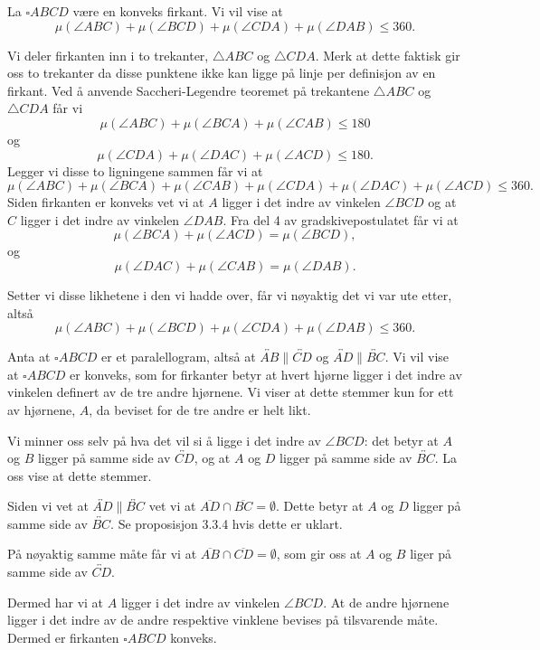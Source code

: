 \begin{oppgave}[4.6.1]
    La $\square ABCD$ være en konveks firkant. Vi vil vise at
    $$\mu(\angle ABC) + \mu(\angle BCD) + \mu(\angle CDA) + \mu(\angle DAB) \leq 360.$$

    \begin{figure}[H]
        \centering
        
    \end{figure}

    Vi deler firkanten inn i to trekanter, $\triangle ABC$ og $\triangle CDA$. 
    Merk at dette faktisk gir oss to trekanter da disse punktene ikke kan ligge på linje per definisjon av en firkant. 
    Ved å anvende Saccheri-Legendre teoremet på trekantene $\triangle ABC$ og $\triangle CDA$ får vi 
    $$\mu(\angle ABC)+\mu(\angle BCA)+\mu(\angle CAB)\leq 180$$
    og
    $$\mu(\angle CDA)+\mu(\angle DAC)+\mu(\angle ACD)\leq 180.$$
    Legger vi disse to ligningene sammen får vi at 
    $$\mu(\angle ABC)+\mu(\angle BCA)+\mu(\angle CAB)+\mu(\angle CDA)+\mu(\angle DAC)+\mu(\angle ACD)\leq 360.$$
    Siden firkanten er konveks vet vi at $A$ ligger i det indre av vinkelen $\angle BCD$ og at $C$ ligger i det indre av vinkelen $\angle DAB$. 
    Fra del 4 av gradskivepostulatet får vi at 
    $$\mu(\angle BCA)+\mu(\angle ACD)=\mu(\angle BCD),$$
    og 
    $$\mu(\angle DAC)+\mu(\angle CAB)=\mu(\angle DAB).$$

    Setter vi disse likhetene i den vi hadde over, får vi nøyaktig det vi var ute etter, altså 
    $$\mu(\angle ABC) + \mu(\angle BCD) + \mu(\angle CDA) + \mu(\angle DAB) \leq 360.$$
\end{oppgave}

\begin{oppgave}[4.6.2]
    Anta at $\square ABCD$ er et paralellogram, altså at $\overleftrightarrow{AB}\parallel \overleftrightarrow{CD}$ og $\overleftrightarrow{AD}\parallel \overleftrightarrow{BC}$.
    Vi vil vise at $\square ABCD$ er konveks, som for firkanter betyr at hvert hjørne ligger i det indre av vinkelen definert av de tre andre hjørnene. 
    Vi viser at dette stemmer kun for ett av hjørnene, $A$, da beviset for de tre andre er helt likt. 

    Vi minner oss selv på hva det vil si å ligge i det indre av $\angle BCD$: 
    det betyr at $A$ og $B$ ligger på samme side av $\overleftrightarrow{CD}$, og at $A$ og $D$ ligger på samme side av $\overleftrightarrow{BC}$. 
    La oss vise at dette stemmer. 

    Siden vi vet at $\overleftrightarrow{AD}\parallel \overleftrightarrow{BC}$ vet vi at $\overline{AD}\cap \overline{BC}=\emptyset$. 
    Dette betyr at $A$ og $D$ ligger på samme side av $\overleftrightarrow{BC}$. Se proposisjon 3.3.4 hvis dette er uklart. 

    På nøyaktig samme måte får vi at $\overline{AB}\cap \overline{CD}=\emptyset$, som gir oss at $A$ og $B$ liger på samme side av $\overleftrightarrow{CD}$.
    
    Dermed har vi at $A$ ligger i det indre av vinkelen $\angle BCD$. 
    At de andre hjørnene ligger i det indre av de andre respektive vinklene bevises på tilsvarende måte. 
    Dermed er firkanten $\square ABCD$ konveks. 
\end{oppgave}

